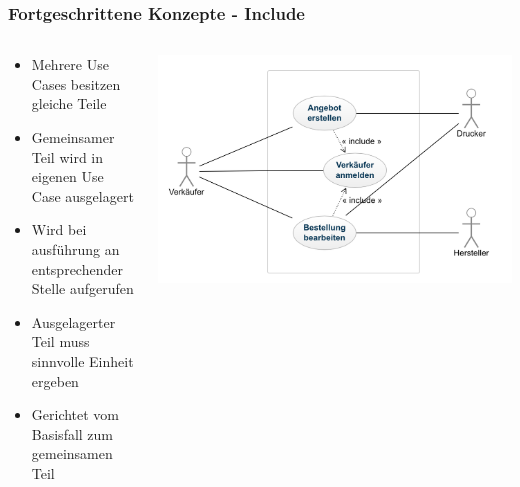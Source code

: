 \begin{frame}
\frametitle{Fortgeschrittene Konzepte - Include}
	\begin{columns}
		\begin{column}{.4\textwidth}
			\scriptsize
			\begin{itemize}
				\item Mehrere Use Cases besitzen gleiche Teile
				\item Gemeinsamer Teil wird in eigenen Use Case ausgelagert
				\item Wird bei ausführung an entsprechender Stelle aufgerufen
				\item Ausgelagerter Teil muss sinnvolle Einheit ergeben
				\item Gerichtet vom Basisfall zum gemeinsamen Teil
			\end{itemize}
			\normalsize
		\end{column}
		\begin{column}{.6\textwidth}
			\center
			\includegraphics[width=1\textwidth,
			keepaspectratio=true]{bilder/include.png}
		\end{column}
	\end{columns}
\end{frame}

